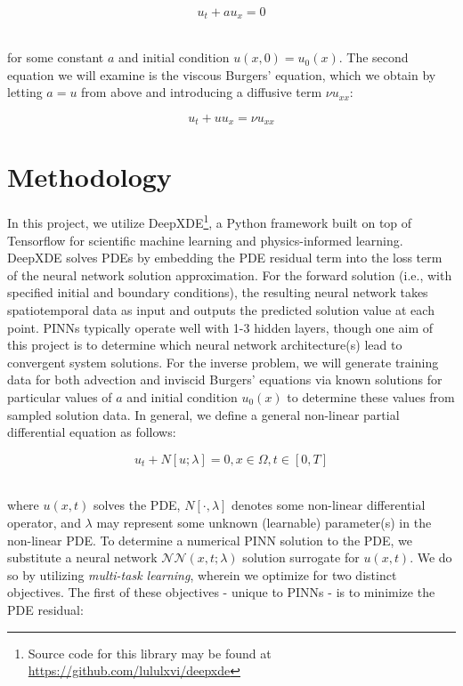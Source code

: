 \documentclass[letterpaper,11pt]{article}
\begin{document}
    $$
    u_t + a u_x = 0
    $$

    \ \\
    \noindent for some constant $a$ and initial condition $u(x, 0) = u_0(x)$. The second equation we will examine is the
    viscous Burgers' equation, which we obtain by letting $a = u$ from above and introducing a diffusive term 
    $\nu u_{xx}$:

    $$
    u_t + u u_x = \nu u_{xx}
    $$

    \section{Methodology}\label{sec:proposed-methodology}

    In this project, we utilize DeepXDE\footnote{
        Source code for this library may be found at
        \hyperlink{https://github.com/lululxvi/deepxde}{https://github.com/lululxvi/deepxde}
    }, a Python framework built on top of Tensorflow for scientific machine learning and physics-informed 
    learning.\cite{lu_deepxde_2021} DeepXDE solves PDEs by embedding the PDE residual term into the loss term of the
    neural network solution approximation. For the forward solution (i.e., with specified initial and boundary 
    conditions), the resulting neural network takes spatiotemporal data as input and outputs the predicted solution 
    value at each point. PINNs typically operate well with 1-3 hidden layers, though one aim of this project is to 
    determine which neural network architecture(s) lead to convergent system solutions. For the inverse problem, we will
    generate training data for both advection and inviscid Burgers' equations via known solutions for particular values
    of $a$ and initial condition $u_0(x)$ to determine these values from sampled solution data. In general, we 
    define a general non-linear partial differential equation as follows:

    $$
    u_t + N[u; \lambda] = 0, x \in \Omega, t \in [0, T]
    $$

    \ \\
    \noindent where $u(x, t)$ solves the PDE, $N[\cdot, \lambda]$ denotes some non-linear differential operator, and 
    $\lambda$ may represent some unknown (learnable) parameter(s) in the non-linear PDE. To determine a numerical PINN 
    solution to the PDE, we substitute a neural network $\mathcal{NN}(x, t; \lambda)$ solution surrogate for $u(x, t)$. 
    We do so by utilizing \textit{multi-task learning}, wherein we optimize for two distinct objectives. The first of 
    these objectives - unique to PINNs - is to minimize the PDE residual:
\end{document}

